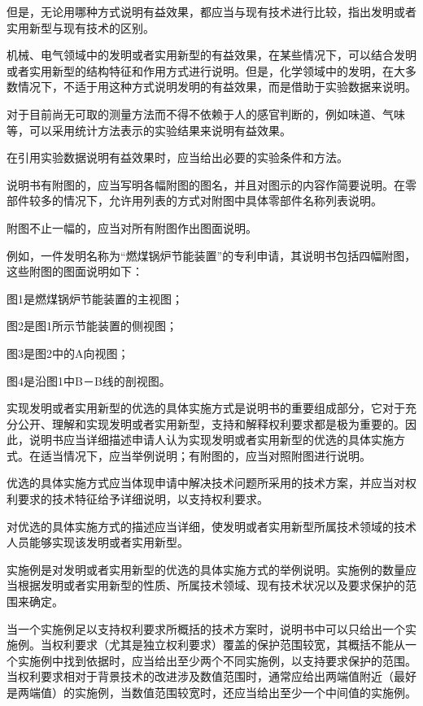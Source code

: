 但是，无论用哪种方式说明有益效果，都应当与现有技术进行比较，指出发明或者实用新型与现有技术的区别。

机械、电气领域中的发明或者实用新型的有益效果，在某些情况下，可以结合发明或者实用新型的结构特征和作用方式进行说明。但是，化学领域中的发明，在大多数情况下，不适于用这种方式说明发明的有益效果，而是借助于实验数据来说明。

对于目前尚无可取的测量方法而不得不依赖于人的感官判断的，例如味道、气味等，可以采用统计方法表示的实验结果来说明有益效果。

在引用实验数据说明有益效果时，应当给出必要的实验条件和方法。

说明书有附图的，应当写明各幅附图的图名，并且对图示的内容作简要说明。在零部件较多的情况下，允许用列表的方式对附图中具体零部件名称列表说明。

附图不止一幅的，应当对所有附图作出图面说明。

例如，一件发明名称为“燃煤锅炉节能装置”的专利申请，其说明书包括四幅附图，这些附图的图面说明如下：

图1是燃煤锅炉节能装置的主视图；

图2是图1所示节能装置的侧视图；

图3是图2中的A向视图；

图4是沿图1中B－B线的剖视图。

实现发明或者实用新型的优选的具体实施方式是说明书的重要组成部分，它对于充分公开、理解和实现发明或者实用新型，支持和解释权利要求都是极为重要的。因此，说明书应当详细描述申请人认为实现发明或者实用新型的优选的具体实施方式。在适当情况下，应当举例说明；有附图的，应当对照附图进行说明。

优选的具体实施方式应当体现申请中解决技术问题所采用的技术方案，并应当对权利要求的技术特征给予详细说明，以支持权利要求。

对优选的具体实施方式的描述应当详细，使发明或者实用新型所属技术领域的技术人员能够实现该发明或者实用新型。

实施例是对发明或者实用新型的优选的具体实施方式的举例说明。实施例的数量应当根据发明或者实用新型的性质、所属技术领域、现有技术状况以及要求保护的范围来确定。

当一个实施例足以支持权利要求所概括的技术方案时，说明书中可以只给出一个实施例。当权利要求（尤其是独立权利要求）覆盖的保护范围较宽，其概括不能从一个实施例中找到依据时，应当给出至少两个不同实施例，以支持要求保护的范围。当权利要求相对于背景技术的改进涉及数值范围时，通常应给出两端值附近（最好是两端值）的实施例，当数值范围较宽时，还应当给出至少一个中间值的实施例。

